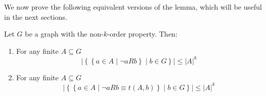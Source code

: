     We now prove the following equivalent versions of the lemma, which will be useful in the next sections.

    \corollary[Claim 2.6.1]\label{itm:2.6.1}
        Let $G$ be a graph with the non-$k$-order property.
        Then:
        \begin{enumerate}
            \item\label{itm:2.6.1.1} For any finite $A \subseteq G$
                $$
                    \left|\left\{ \left\{ a \in A \mid \neg a R b \right\} \mid b \in G \right\} \right|
                        \leq |A|^k
                $$
            \item\label{itm:2.6.1.2} For any finite $A \subseteq G$
                $$
                    \left|\left\{ \left\{ a \in A \mid \neg a R b \equiv t(A,b) \right\} \mid b \in G \right\} \right|
                        \leq |A|^k
                $$
        \end{enumerate}
